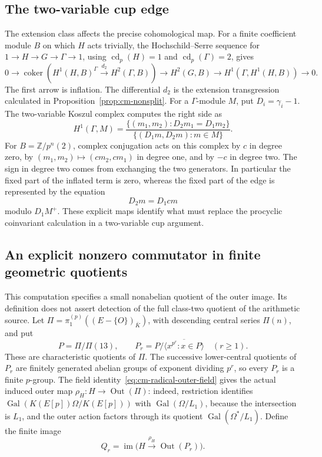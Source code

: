 \documentclass[11pt]{article}
\theoremstyle{definition}\newtheorem{definition}[theorem]{Definition}
\begin{document}
\subsection{The two-variable cup edge}

The extension class affects the precise cohomological map.
For a finite coefficient module \(B\) on which \(H\) acts
trivially, the Hochschild--Serre sequence for
\(1\to H\to G\to\Gamma\to1\), using
\(\operatorname{cd}_p(H)=1\) and
\(\operatorname{cd}_p(\Gamma)=2\), gives
\[
 0\longrightarrow
 \operatorname{coker}\!\left(
  H^1(H,B)^\Gamma\xrightarrow{d_2}H^2(\Gamma,B)\right)
 \longrightarrow H^2(G,B)
 \longrightarrow H^1(\Gamma,H^1(H,B))
 \longrightarrow0 .
\]
The first arrow is inflation. The differential \(d_2\)
is the extension transgression calculated in
Proposition~\ref{prop:cm-nonsplit}.
For a \(\Gamma\)-module \(M\), put \(D_i=\gamma_i-1\).
The two-variable Koszul complex computes the right
side as
\[
 H^1(\Gamma,M)=
 \frac{\{(m_1,m_2):D_2m_1=D_1m_2\}}
      {\{(D_1m,D_2m):m\in M\}} .
\]
For \(B=\mathbb Z/p^n(2)\), complex conjugation acts on
this complex by \(c\) in degree zero, by
\((m_1,m_2)\mapsto(cm_2,cm_1)\) in degree one,
and by \(-c\) in degree two. The sign in degree two
comes from exchanging the two generators.
In particular the fixed part of the inflated term is
zero, whereas the fixed part of the edge is represented
by the equation
\[
 D_2m=D_1cm
\]
modulo \(D_1M^+\). These explicit maps identify what
must replace the procyclic coinvariant calculation
in a two-variable cup argument.

\subsection{An explicit nonzero commutator in finite geometric quotients}
\label{subsec:cm-low-class-two}

This computation specifies a small nonabelian quotient of the
outer image.  Its definition does not assert detection of the full
class-two quotient of the arithmetic source.
Let \(\Pi=\pi_1^{(p)}((E-\{O\})_{\bar K})\), with descending central
series \(\Pi(n)\), and put
\[
 P=\Pi/\Pi(13),\qquad
 P_r=P/\overline{\langle x^{p^r}:x\in P\rangle}\quad(r\geq1).
\]
These are characteristic quotients of \(\Pi\). The successive
lower-central quotients of \(P_r\) are finitely generated abelian
groups of exponent dividing \(p^r\), so every \(P_r\) is a finite \(p\)-group.
The field identity~\eqref{eq:cm-radical-outer-field} gives the
actual induced outer map \(\rho_H:H\longrightarrow\operatorname{Out}(\Pi)\):
indeed, restriction identifies
\(\operatorname{Gal}(K(E[p])\Omega/K(E[p]))\) with
\(\operatorname{Gal}(\Omega/L_1)\), because the intersection is
\(L_1\), and the outer action factors through its quotient
\(\operatorname{Gal}(\Omega^*/L_1)\).
Define the finite image
\[
 Q_r=\operatorname{im}\bigl(H\xrightarrow{\rho_H}
                              \operatorname{Out}(P_r)\bigr).
\]
\end{document}
